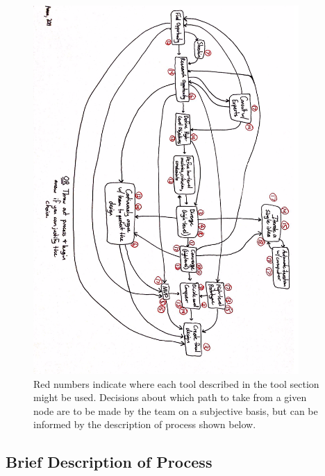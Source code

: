 \documentclass[a4paper,12pt]{article}
\begin{document}
\begin{figure}[H]
\centering
\includegraphics[width=0.9\textwidth]{img/image024.png}
\caption{Red numbers indicate where each tool described in the tool section might be used. Decisions about which path to take from a given node are to be made by the team on a subjective basis, but can be informed by the description of process shown below.}
\label{}
\end{figure}

\subsection{Brief Description of Process}
\end{document}
